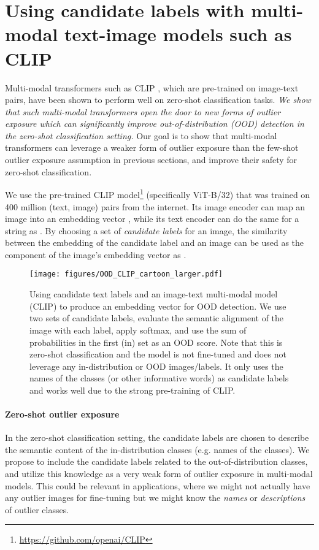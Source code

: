 \documentclass{article}
\begin{document}
\vspace{-0.5em}
\section{Using candidate labels with multi-modal text-image models such as CLIP}\label{sec:clip}
\vspace{-0.5em}
Multi-modal transformers such as CLIP \citep{clip}, which are pre-trained on image-text pairs, have been shown to perform well on zero-shot classification tasks. 
\emph{We show that such multi-modal transformers open the door to new forms of outlier exposure which can significantly improve   
out-of-distribution (OOD) detection in the  zero-shot classification setting.} Our goal is to show that multi-modal transformers can leverage a weaker form of outlier exposure than the few-shot outlier exposure assumption in previous sections, and improve their safety for zero-shot classification.   

We use the pre-trained CLIP model\footnote{\url{https://github.com/openai/CLIP}} (specifically ViT-B/32) that was trained on 400 million (text, image) pairs from the internet. Its image encoder can map an image  into an embedding vector , while its text encoder can do the same for a string  as . By choosing a set of  \textit{candidate labels} for an image, the similarity between the embedding of the candidate label  and an image  can be used as the  component of the image's embedding vector  as . \begin{figure}[th]
	\centering
\texttt{[image: figures/OOD\_CLIP\_cartoon\_larger.pdf]}
	\caption{Using candidate text labels and an image-text multi-modal model (CLIP) to produce an embedding vector for OOD detection. We use two sets of candidate labels, evaluate the semantic alignment of the image with each label, apply softmax, and use the sum of probabilities in the first (in) set as an OOD score. Note that this is zero-shot classification and the model is not fine-tuned and does not leverage any in-distribution or OOD images/labels. 
It only uses the names of the classes (or other informative words) as candidate labels and works well due to the strong pre-training of CLIP.}
	\vspace{-1em}
	\label{fig:CLIP_text_image_cartoon}
\end{figure}


\vspace{-0.5em}
\paragraph{Zero-shot outlier exposure} In the zero-shot classification setting, the candidate labels are chosen to describe the semantic content of the in-distribution classes (e.g. names of the classes). We propose to include the candidate labels related to the out-of-distribution classes, and utilize this knowledge as a very weak form of outlier exposure in multi-modal models. This could be relevant in applications, where we might not actually have any outlier images for fine-tuning but we might know the \emph{names} or \emph{descriptions} of outlier classes. 
\end{document}

